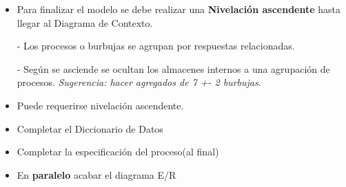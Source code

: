 \begin{itemize}[noitemsep]
\item Para finalizar el modelo se debe realizar una \textbf{Nivelación ascendente} hasta llegar al Diagrama de Contexto.

  - Los procesos o burbujas se agrupan por respuestas relacionadas.

  - Según se asciende se ocultan los almacenes internos a una agrupación de procesos. \textit{Sugerencia: hacer agregados de 7 +- 2 burbujas}.

\item Puede requerirse nivelación ascendente.
\item Completar el Diccionario de Datos
\item Completar la especificación del proceso(al final)
\item En \textbf{paralelo} acabar el diagrama E/R
\end{itemize}
